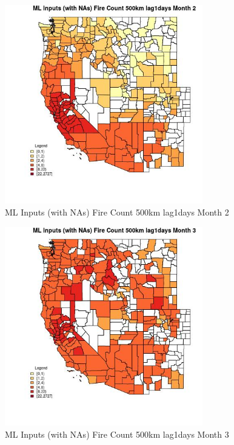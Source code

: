 \begin{figure} 
\centering  
\includegraphics[width=0.77\textwidth]{Code_Outputs/Report_ML_input_PM25_Step4_part_f_de_duplicated_aveswNAs_CountyFire_Count_500km_lag1daysmedianMonth2.jpg} 
\caption{\label{fig:Report_ML_input_PM25_Step4_part_f_de_duplicated_aveswNAsCountyFire_Count_500km_lag1daysmedianMonth2}ML Inputs (with NAs) Fire Count 500km lag1days Month 2} 
\end{figure} 
 

\begin{figure} 
\centering  
\includegraphics[width=0.77\textwidth]{Code_Outputs/Report_ML_input_PM25_Step4_part_f_de_duplicated_aveswNAs_CountyFire_Count_500km_lag1daysmedianMonth3.jpg} 
\caption{\label{fig:Report_ML_input_PM25_Step4_part_f_de_duplicated_aveswNAsCountyFire_Count_500km_lag1daysmedianMonth3}ML Inputs (with NAs) Fire Count 500km lag1days Month 3} 
\end{figure} 
 

